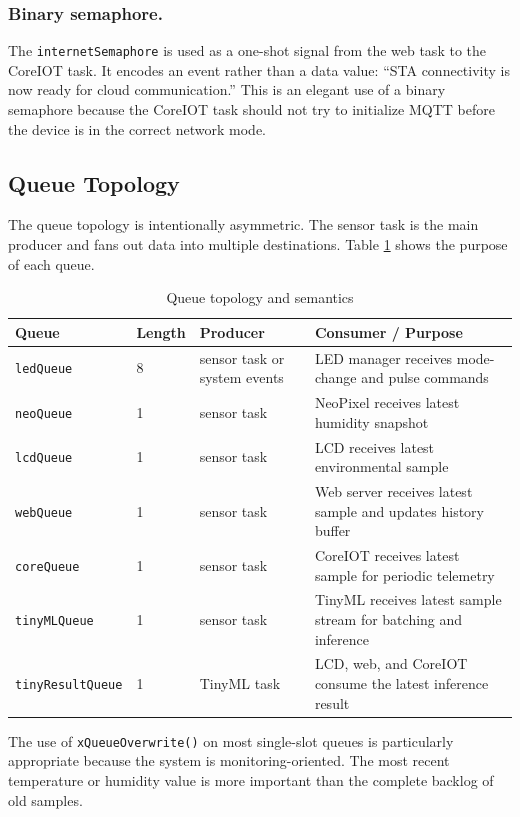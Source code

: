 \subsubsection*{Binary semaphore.}
The \texttt{internetSemaphore} is used as a one-shot signal from the web task to
the CoreIOT task. It encodes an event rather than a data value: ``STA
connectivity is now ready for cloud communication.'' This is an elegant use of
a binary semaphore because the CoreIOT task should not try to initialize MQTT
before the device is in the correct network mode.

\subsection{Queue Topology}
The queue topology is intentionally asymmetric. The sensor task is the main
producer and fans out data into multiple destinations. Table
\ref{tab:queue-topology} shows the purpose of each queue.

\begin{table}[H]
\centering
\caption{Queue topology and semantics}
\label{tab:queue-topology}
\begin{tabular}{p{3cm}p{2cm}p{4cm}p{6cm}}
\toprule
\textbf{Queue} & \textbf{Length} & \textbf{Producer} & \textbf{Consumer / Purpose} \\
\midrule
\texttt{ledQueue} & 8 & sensor task or system events & LED manager receives mode-change and pulse commands \\
\texttt{neoQueue} & 1 & sensor task & NeoPixel receives latest humidity snapshot \\
\texttt{lcdQueue} & 1 & sensor task & LCD receives latest environmental sample \\
\texttt{webQueue} & 1 & sensor task & Web server receives latest sample and updates history buffer \\
\texttt{coreQueue} & 1 & sensor task & CoreIOT receives latest sample for periodic telemetry \\
\texttt{tinyMLQueue} & 1 & sensor task & TinyML receives latest sample stream for batching and inference \\
\texttt{tinyResultQueue} & 1 & TinyML task & LCD, web, and CoreIOT consume the latest inference result \\
\bottomrule
\end{tabular}
\end{table}

The use of \texttt{xQueueOverwrite()} on most single-slot queues is particularly
appropriate because the system is monitoring-oriented. The most recent
temperature or humidity value is more important than the complete backlog of old
samples.

